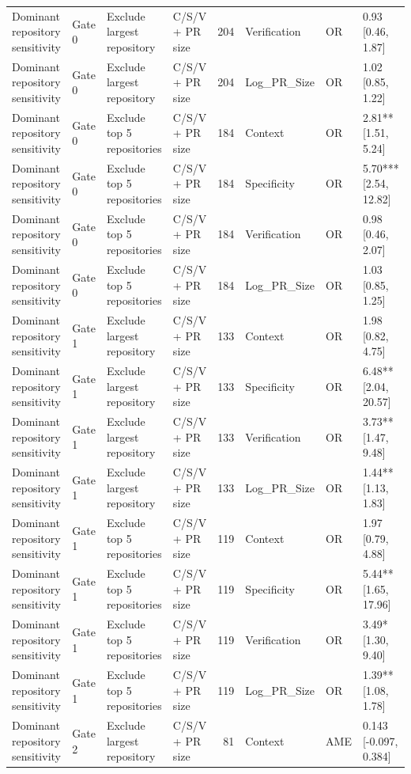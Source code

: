 \begin{table}
\begin{tabular}{llllrlll}
Dominant repository sensitivity & Gate 0 & Exclude largest repository & C/S/V + PR size & 204 & Verification & OR & 0.93 [0.46, 1.87] \\
Dominant repository sensitivity & Gate 0 & Exclude largest repository & C/S/V + PR size & 204 & Log\_PR\_Size & OR & 1.02 [0.85, 1.22] \\
Dominant repository sensitivity & Gate 0 & Exclude top 5 repositories & C/S/V + PR size & 184 & Context & OR & 2.81** [1.51, 5.24] \\
Dominant repository sensitivity & Gate 0 & Exclude top 5 repositories & C/S/V + PR size & 184 & Specificity & OR & 5.70*** [2.54, 12.82] \\
Dominant repository sensitivity & Gate 0 & Exclude top 5 repositories & C/S/V + PR size & 184 & Verification & OR & 0.98 [0.46, 2.07] \\
Dominant repository sensitivity & Gate 0 & Exclude top 5 repositories & C/S/V + PR size & 184 & Log\_PR\_Size & OR & 1.03 [0.85, 1.25] \\
Dominant repository sensitivity & Gate 1 & Exclude largest repository & C/S/V + PR size & 133 & Context & OR & 1.98 [0.82, 4.75] \\
Dominant repository sensitivity & Gate 1 & Exclude largest repository & C/S/V + PR size & 133 & Specificity & OR & 6.48** [2.04, 20.57] \\
Dominant repository sensitivity & Gate 1 & Exclude largest repository & C/S/V + PR size & 133 & Verification & OR & 3.73** [1.47, 9.48] \\
Dominant repository sensitivity & Gate 1 & Exclude largest repository & C/S/V + PR size & 133 & Log\_PR\_Size & OR & 1.44** [1.13, 1.83] \\
Dominant repository sensitivity & Gate 1 & Exclude top 5 repositories & C/S/V + PR size & 119 & Context & OR & 1.97 [0.79, 4.88] \\
Dominant repository sensitivity & Gate 1 & Exclude top 5 repositories & C/S/V + PR size & 119 & Specificity & OR & 5.44** [1.65, 17.96] \\
Dominant repository sensitivity & Gate 1 & Exclude top 5 repositories & C/S/V + PR size & 119 & Verification & OR & 3.49* [1.30, 9.40] \\
Dominant repository sensitivity & Gate 1 & Exclude top 5 repositories & C/S/V + PR size & 119 & Log\_PR\_Size & OR & 1.39** [1.08, 1.78] \\
Dominant repository sensitivity & Gate 2 & Exclude largest repository & C/S/V + PR size & 81 & Context & AME & 0.143 [-0.097, 0.384] \\

\end{tabular}
\end{table}

